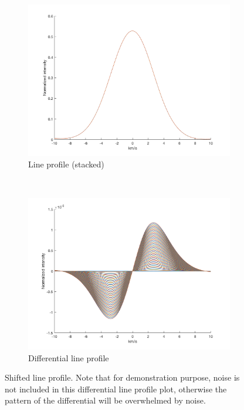 \begin{figure}[tbp]
    \begin{subfigure}[b]{0.49\textwidth}
        \includegraphics[width=\textwidth]{./Figures/Methods/1-Line_Profile.png}
        \caption{Line profile (stacked)}
        \label{fig:line_profiles}
    \end{subfigure}
	~
    \begin{subfigure}[b]{0.49\textwidth}
        \includegraphics[width=\textwidth]{./Figures/Methods/1-Differential_line_Profile.png}
        \caption{Differential line profile}
        \label{fig:differential_line_profiles}
    \end{subfigure}	
    
    \caption[Shifted line profile]{Shifted line profile. Note that for demonstration purpose, noise is not included in  
    this differential line profile plot, otherwise the pattern of the differential will be overwhelmed by noise.}
\label{fig:line_profiles12}
\end{figure}	
	
